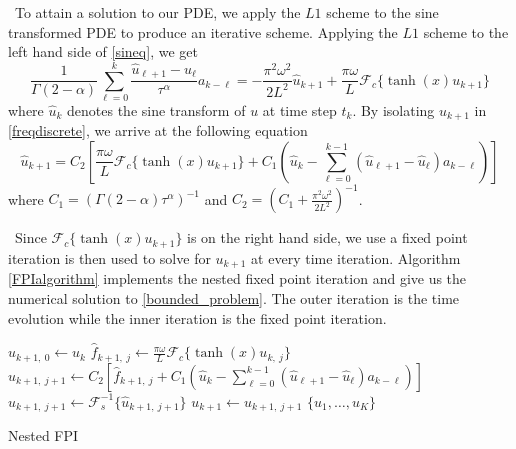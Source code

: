 \documentclass{siamart1116}
\newcommand{\LB}[1]{{\color{blue}~\textsf{#1}}}
\begin{document}
\LB{To attain a solution to our PDE, we apply the $L1$ scheme to the sine transformed PDE to produce an iterative scheme. Applying the $L1$ scheme to the left hand side of \eqref{sineq},} we get 
\begin{equation}
\frac{1}{\Gamma(2-\alpha)}\sum_{\ell=0}^{k}\frac{\hat{u}_{\ell+1}-\hat{u}_{\ell}}{\tau^\alpha}a_{k-\ell}=-\frac{\pi^2\omega^2}{2L^2}\hat{u}_{k+1}+\frac{\pi\omega}{L}\mathcal{F}_c\{\tanh(x)u_{k+1}\}\label{freqdiscrete}
\end{equation}
where $\hat{u}_{k}$ denotes the sine transform of $u$ at time step $t_k$. By isolating $\hat{u}_{k+1}$ in \eqref{freqdiscrete}, we arrive at the following equation
\begin{equation}
\hat{u}_{k+1}=C_2\left[\frac{\pi\omega}{L}\mathcal{F}_c\{\tanh(x)u_{k+1}\}+C_1\left(\hat{u}_k-\sum_{\ell=0}^{k-1}(\hat{u}_{\ell+1}-\hat{u}_{\ell})a_{k-\ell}\right)\right]
\end{equation}
where $C_1=\left(\Gamma(2-\alpha)\tau^\alpha\right)^{-1}$ and $C_2=\left(C_1+\frac{\pi^2\omega^2}{2L^2}\right)^{-1}$.

\LB{Since $\mathcal{F}_c\{\tanh(x)u_{k+1}\}$ is on the right hand side, we use} a fixed point iteration is then used to solve for $u_{k+1}$ at every time iteration. Algorithm \ref{FPIalgorithm} implements the nested fixed point iteration and give us the numerical solution to \eqref{bounded_problem}. The outer iteration is the time evolution while the inner iteration is the fixed point iteration.
\begin{algorithm}[h!]\begin{algorithmic}[1]
\STATE $u_{k+1,\ 0}\leftarrow u_{k}$
\STATE $\hat{f}_{k+1,\ j}\leftarrow\frac{\pi\omega}{L}\mathcal{F}_c\{\tanh(x)u_{k,\ j}\}$
\STATE $\hat{u}_{k+1,\ j+1}\leftarrow C_2\left[\hat{f}_{k+1,\ j}+C_1\left(\hat{u}_k-\sum_{\ell=0}^{k-1}(\hat{u}_{\ell+1}-\hat{u}_{\ell})a_{k-\ell}\right)\right]$
\STATE $u_{k+1,\ j+1}\leftarrow\mathcal{F}^{-1}_s\{\hat{u}_{k+1,\ j+1}\}$
\ENDWHILE
\STATE $u_{k+1} \leftarrow u_{k+1,\ j+1}$
\ENDFOR
\RETURN $\{ u_1,\ldots,u_K\}$
\end{algorithmic}
\caption{Nested FPI }
\label{FPIalgorithm}
\end{algorithm}
\end{document}
